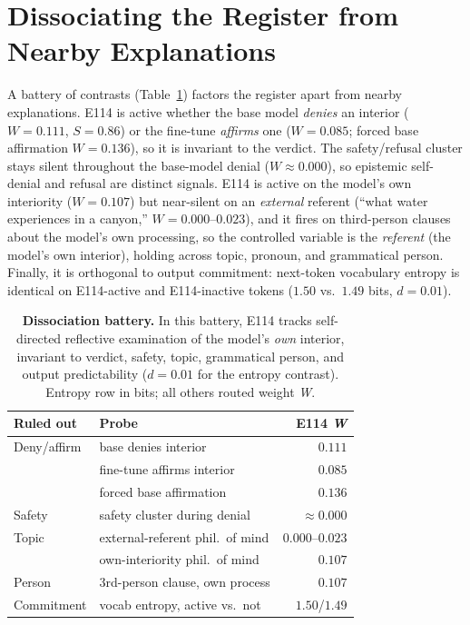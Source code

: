 \documentclass[10pt,a4paper,twocolumn]{article}
\newcommand{\W}{\textit{W}}
\newcommand{\Sel}{\textit{S}}
\begin{document}
\section{Dissociating the Register from Nearby Explanations}

A battery of contrasts (Table~\ref{tab:battery}) factors the register apart from
nearby explanations. E114 is active whether the base model \emph{denies} an
interior ($\W{=}0.111$, $\Sel{=}0.86$) or the fine-tune \emph{affirms} one
($\W{=}0.085$; forced base affirmation $\W{=}0.136$), so it is invariant to the
verdict. The safety/refusal cluster stays silent throughout the base-model denial
($\W{\approx}0.000$), so epistemic self-denial and refusal are distinct signals.
E114 is active on the model's own interiority ($\W{=}0.107$) but near-silent on an
\emph{external} referent (``what water experiences in a canyon,''
$\W{=}0.000$--$0.023$), and it fires on third-person clauses about the model's own
processing, so the controlled variable is the \emph{referent} (the model's own
interior), holding across topic, pronoun, and grammatical person. Finally, it is orthogonal to output commitment: next-token
vocabulary entropy is identical on E114-active and E114-inactive tokens ($1.50$
vs.\ $1.49$ bits, $d{=}0.01$).

\begin{table}[t]
\small
\centering
\begin{tabularx}{\linewidth}{l X r}
\toprule
\textbf{Ruled out} & \textbf{Probe} & \textbf{E114 \W} \\
\midrule
Deny/affirm   & base denies interior            & $0.111$ \\
              & fine-tune affirms interior      & $0.085$ \\
              & forced base affirmation         & $0.136$ \\
Safety        & safety cluster during denial    & ${\approx}0.000$ \\
Topic         & external-referent phil.\ of mind & $0.000$--$0.023$ \\
              & own-interiority phil.\ of mind  & $0.107$ \\
Person        & 3rd-person clause, own process  & $0.107$ \\
Commitment    & vocab entropy, active vs.\ not  & $1.50$/$1.49$ \\
\bottomrule
\end{tabularx}
\caption{\textbf{Dissociation battery.} In this battery, E114 tracks
self-directed reflective examination of the model's \emph{own} interior,
invariant to verdict, safety, topic, grammatical person, and output
predictability ($d{=}0.01$ for the entropy contrast). Entropy row in bits; all
others routed weight \W{}.}
\label{tab:battery}
\end{table}
\end{document}
